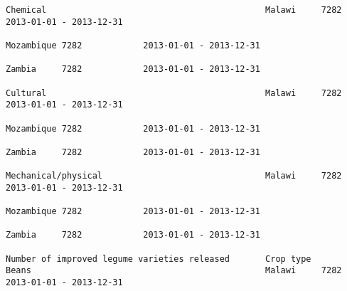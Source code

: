 \documentclass[11pt]{article}
\begin{document}
\begin{Verbatim}[commandchars=\\\{\}]
                                                                                                                                                              Chemical                                           Malawi     7282            2013-01-01 - 2013-12-31   
                                                                                                                                                                                                                 Mozambique 7282            2013-01-01 - 2013-12-31   
                                                                                                                                                                                                                 Zambia     7282            2013-01-01 - 2013-12-31   
                                                                                                                                                              Cultural                                           Malawi     7282            2013-01-01 - 2013-12-31   
                                                                                                                                                                                                                 Mozambique 7282            2013-01-01 - 2013-12-31   
                                                                                                                                                                                                                 Zambia     7282            2013-01-01 - 2013-12-31   
                                                                                                                                                              Mechanical/physical                                Malawi     7282            2013-01-01 - 2013-12-31   
                                                                                                                                                                                                                 Mozambique 7282            2013-01-01 - 2013-12-31   
                                                                                                                                                                                                                 Zambia     7282            2013-01-01 - 2013-12-31   
                                                                         Number of improved legume varieties released       Crop type                         Beans                                              Malawi     7282            2013-01-01 - 2013-12-31   

\end{Verbatim}
\end{document}
